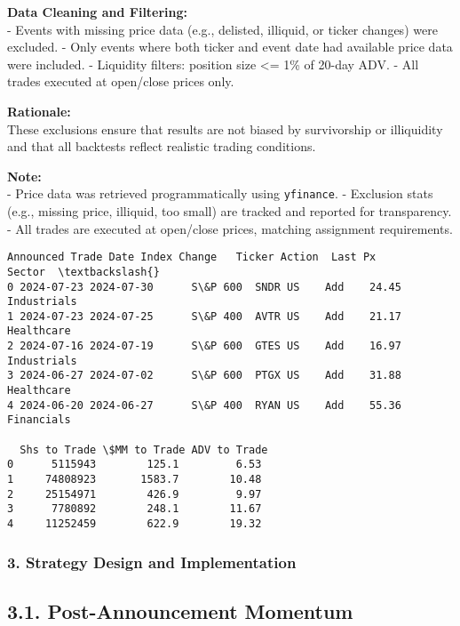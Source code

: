 \documentclass[11pt]{article}
\begin{document}
\textbf{Data Cleaning and Filtering:}\\
- Events with missing price data (e.g., delisted, illiquid, or ticker
changes) were excluded. - Only events where both ticker and event date
had available price data were included. - Liquidity filters: position
size \textless= 1\% of 20-day ADV. - All trades executed at open/close
prices only.

\textbf{Rationale:}\\
These exclusions ensure that results are not biased by survivorship or
illiquidity and that all backtests reflect realistic trading conditions.

\textbf{Note:}\\
- Price data was retrieved programmatically using \texttt{yfinance}. -
Exclusion stats (e.g., missing price, illiquid, too small) are tracked
and reported for transparency. - All trades are executed at open/close
prices, matching assignment requirements.

    
    \begin{Verbatim}[commandchars=\\\{\}]
   Announced Trade Date Index Change   Ticker Action  Last Px       Sector  \textbackslash{}
0 2024-07-23 2024-07-30      S\&P 600  SNDR US    Add    24.45  Industrials   
1 2024-07-23 2024-07-25      S\&P 400  AVTR US    Add    21.17   Healthcare   
2 2024-07-16 2024-07-19      S\&P 600  GTES US    Add    16.97  Industrials   
3 2024-06-27 2024-07-02      S\&P 600  PTGX US    Add    31.88   Healthcare   
4 2024-06-20 2024-06-27      S\&P 400  RYAN US    Add    55.36   Financials   

  Shs to Trade \$MM to Trade ADV to Trade  
0      5115943        125.1         6.53  
1     74808923       1583.7        10.48  
2     25154971        426.9         9.97  
3      7780892        248.1        11.67  
4     11252459        622.9        19.32  
    \end{Verbatim}

    
    \subsubsection*{3. Strategy Design and
Implementation}\label{strategy-design-and-implementation}

\subsection*{3.1. Post-Announcement
Momentum}\label{post-announcement-momentum}
\end{document}
